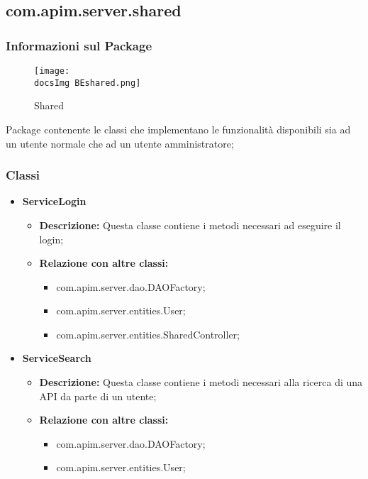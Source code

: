 {{{       \subsection{com.apim.server.shared}{
    \subsubsection{Informazioni sul Package}
        \begin{figure}[H]
          \centering
          \texttt{[image: \\docsImg BEshared.png]}
          \caption{Shared}
          \label{Shared}
        \end{figure}
        Package  contenente le classi che implementano le funzionalità disponibili sia ad un utente normale che ad un utente amministratore;
        \subsubsection{Classi}
        \begin{itemize} \itemsep1pt
          \item \textbf{ServiceLogin}
          \begin{itemize}
            \item \textbf{Descrizione:} Questa classe contiene i metodi necessari ad eseguire il login;
            \item \textbf{Relazione con altre classi:}
            \begin{itemize}
              \item com.apim.server.dao.DAOFactory;
              \item com.apim.server.entities.User;
              \item com.apim.server.entities.SharedController;
            \end{itemize}
          \end{itemize}
          \item \textbf{ServiceSearch}
          \begin{itemize}
            \item \textbf{Descrizione:} Questa classe contiene i metodi necessari alla ricerca di una API da parte di un utente;
            \item \textbf{Relazione con altre classi:}
            \begin{itemize}
              \item com.apim.server.dao.DAOFactory;
              \item com.apim.server.entities.User;

\end{itemize}
\end{itemize}
\end{itemize}}}}}
